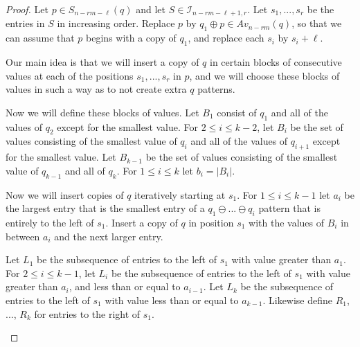 \documentclass[11pt, final]{amsart}
\theoremstyle{remark}
\numberwithin{equation}{section}
\begin{document}
\begin{proof}
    Let $p\in S_{n - rm - \ell }(q)$ and let $S \in \mathcal{I}_{n-rm-\ell+1, r}$. Let $s_1, ..., s_{r}$ be the entries in $S$ in increasing order. Replace $p$ by $q_1 \oplus p \in Av_{n - rm}(q)$, so that we can assume that $p$ begins with a copy of $q_1$, and replace each $s_i$ by $s_i + \ell$.
    
    Our main idea is that we will insert a copy of $q$ in certain blocks of consecutive values at each of the positions $s_1, ..., s_{r}$ in $p$, and we will choose these blocks of values in such a way as to not create extra $q$ patterns.

    Now we will define these blocks of values. Let $B_1$ consist of $q_1$ and all of the values of $q_2$ except for the smallest value. For $2\leq i \leq k-2$, let $B_i$ be the set of values consisting of the smallest value of $q_i$ and all of the values of $q_{i+1}$ except for the smallest value. Let $B_{k-1}$ be the set of values consisting of the smallest value of $q_{k-1}$ and all of $q_k$. For $1 \leq i \leq k$ let $b_i = |B_i|$. 
    

    Now we will insert copies of $q$ iteratively starting at $s_1$. For $1\leq i \leq k-1$ let $a_i$ be the largest entry that is the smallest entry of a $q_1 \ominus ... \ominus q_i$ pattern that is entirely to the left of $s_1$. Insert a copy of $q$ in position $s_1$ with the values of $B_i$ in between $a_i$ and the next larger entry.

    Let $L_1$ be the subsequence of entries to the left of $s_1$ with value greater than $a_1$. For $2\leq i \leq k-1$, let $L_i$ be the subsequence of entries to the left of $s_1$ with value greater than $a_i$, and less than or equal to $a_{i-1}$. Let $L_{k}$ be the subsequence of entries to the left of $s_1$ with value less than or equal to $a_{k-1}$. Likewise define $R_1$, ..., $R_k$ for entries to the right of $s_1$.

    \begin{figure}[H]
        \centering
\end{figure}
\end{proof}
\end{document}
